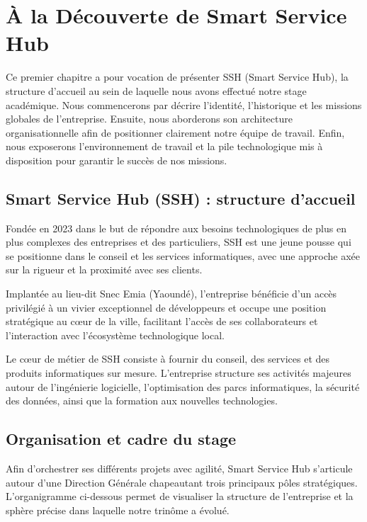 \chapter{À la Découverte de Smart Service Hub}

Ce premier chapitre a pour vocation de présenter \ac{SSH} (Smart Service Hub), la structure d'accueil au sein de laquelle nous avons effectué notre stage académique. Nous commencerons par décrire l'identité, l'historique et les missions globales de l'entreprise. Ensuite, nous aborderons son architecture organisationnelle afin de positionner clairement notre équipe de travail. Enfin, nous exposerons l'environnement de travail et la pile technologique mis à disposition pour garantir le succès de nos missions.

\section{Smart Service Hub (SSH) : structure d'accueil}

Fondée en 2023 dans le but de répondre aux besoins technologiques de plus en plus complexes des entreprises et des particuliers, \ac{SSH} est une jeune pousse qui se positionne dans le conseil et les services informatiques, avec une approche axée sur la rigueur et la proximité avec ses clients.

Implantée au lieu-dit Snec Emia (Yaoundé), l'entreprise bénéficie d'un accès privilégié à un vivier exceptionnel de développeurs et occupe une position stratégique au cœur de la ville, facilitant l'accès de ses collaborateurs et l'interaction avec l'écosystème technologique local.

Le cœur de métier de \ac{SSH} consiste à fournir du conseil, des services et des produits informatiques sur mesure. L'entreprise structure ses activités majeures autour de l'ingénierie logicielle, l'optimisation des parcs informatiques, la sécurité des données, ainsi que la formation aux nouvelles technologies.

\section{Organisation et cadre du stage}

Afin d'orchestrer ses différents projets avec agilité, Smart Service Hub s'articule autour d'une Direction Générale chapeautant trois principaux pôles stratégiques. L'organigramme ci-dessous permet de visualiser la structure de l'entreprise et la sphère précise dans laquelle notre trinôme a évolué.

